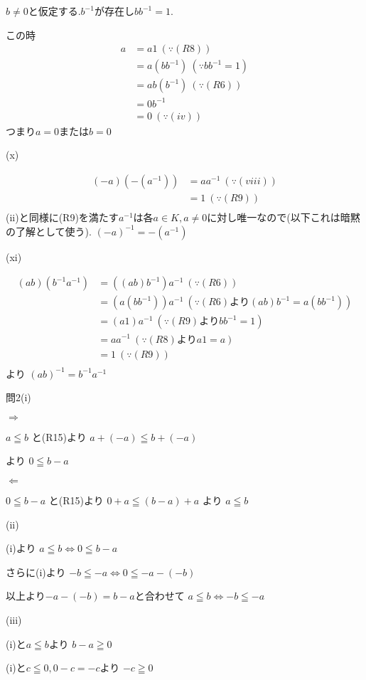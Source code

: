 \documentclass{jsarticle}
\begin{document}
$b\neq 0$と仮定する.$b^{-1}$が存在し$bb^{-1}=1$.


この時
\begin{align*}
a &= a1 \ (\because (R8))\\
&= a(bb^{-1}) \ (\because bb^{-1}=1)\\
&= ab(b^{-1}) \ (\because (R6))\\
&= 0b^{-1}\\
&= 0 \ (\because (iv))
\end{align*}
つまり$a=0$または$b=0$

(x)

\begin{align*}
(-a)(-(a^{-1})) &= aa^{-1} \ (\because (viii))\\
&= 1 \ (\because (R9))\\
\end{align*}
(ii)と同様に(R9)を満たす$a^{-1}$は各$a\in K,a\neq 0$に対し唯一なので(以下これは暗黙の了解として使う).
$(-a)^{-1}=-(a^{-1})$

(xi)

\begin{align*}
(ab)(b^{-1}a^{-1})&=((ab)b^{-1})a^{-1} \ (\because (R6))\\
&=(a(bb^{-1}))a^{-1} \ (\because (R6) より(ab)b^{-1}=a(bb^{-1}))\\
&=(a1)a^{-1} \ (\because (R9) よりbb^{-1}=1)\\
&=aa^{-1} \ (\because (R8) よりa1=a)\\
&=1 \ (\because (R9))\\
\end{align*}
より
$(ab)^{-1}=b^{-1}a^{-1}$


問2(i)


$\Rightarrow$


$a\leqq b$
と(R15)より
$a+(-a)\leqq b+(-a)$

より
$0\leqq b-a$


$\Leftarrow$


$0\leqq b-a$
と(R15)より
$0+a\leqq (b-a)+a$
より
$a\leqq b$


(ii)


(i)より
$a\leqq b \Leftrightarrow 0\leqq b-a$

さらに(i)より
$-b\leqq -a \Leftrightarrow 0\leqq -a-(-b)$

以上より$-a-(-b)=b-a$と合わせて
$a\leqq b \Leftrightarrow -b\leqq -a$


(iii)


(i)と$a\leqq b$より
$b-a \geqq 0$

(i)と$c\leqq 0,0-c=-c$より
$-c\geqq 0$
\end{document}
